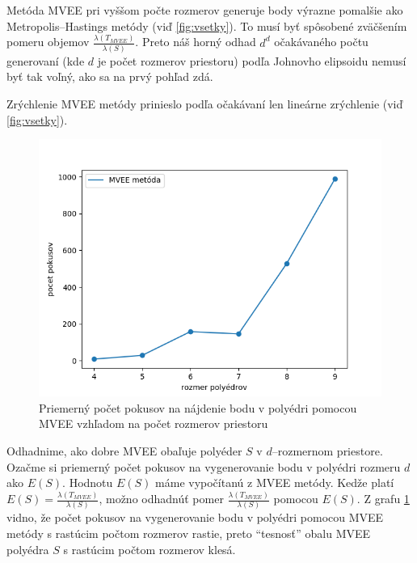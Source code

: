 Metóda MVEE pri vyššom počte rozmerov generuje body výrazne pomalšie ako Metropolis--Hastings metódy (viď \ref{fig:vsetky}).
To musí byť spôsobené zväčšením pomeru objemov $\frac{\lambda(T_{MVEE})}{\lambda(S)}$. Preto náš horný odhad $d^d$ očakávaného počtu generovaní (kde $d$ je počet rozmerov priestoru) podľa Johnovho elipsoidu nemusí byť tak voľný, ako sa na prvý pohľad zdá.

Zrýchlenie MVEE metódy prinieslo podľa očakávaní len lineárne zrýchlenie (viď \ref{fig:vsetky}).




\begin{figure} [H]
	\includegraphics[width=\linewidth]{images/mvee_pokusy.png}
	\caption{Priemerný počet pokusov na nájdenie bodu v polyédri pomocou MVEE vzhľadom na počet rozmerov priestoru}
	\label{fig:mvee_pokusy}
\end{figure}

Odhadnime, ako dobre MVEE obaľuje polyéder $S$ v $d$--rozmernom priestore. Ozačme si priemerný počet pokusov na vygenerovanie bodu v polyédri rozmeru $d$ ako $E(S)$. Hodnotu $E(S)$ máme vypočítanú z MVEE metódy. Kedže platí $E(S)=\frac{\lambda(T_{MVEE})}{\lambda(S)}$, možno odhadnúť pomer $\frac{\lambda(T_{MVEE})}{\lambda(S)}$ pomocou $E(S)$. Z grafu \ref{fig:mvee_pokusy} vidno, že počet pokusov na vygenerovanie bodu v polyédri pomocou MVEE metódy s rastúcim počtom rozmerov rastie, preto ``tesnosť'' obalu MVEE polyédra $S$ s rastúcim počtom rozmerov klesá.

